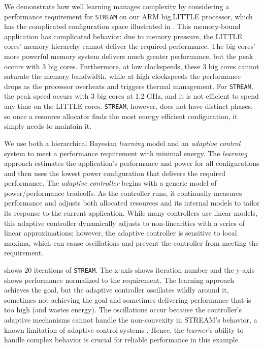 We demonstrate how well learning manages complexity by considering a
performance requirement for \texttt{STREAM} on our ARM big.LITTLE
processor, which has the complicated configuration space illustrated
in .  This memory-bound application has
complicated behavior: due to memory pressure, the LITTLE cores' memory
hierarchy cannot deliver the required performance.  The big cores'
more powerful memory system delivers much greater performance, but the
peak occurs with 3 big cores.  Furthermore, at low clockspeeds, these
3 big cores cannot saturate the memory bandwidth, while at high
clockspeeds the performance drops as the processor overheats and
triggers thermal management.  For \texttt{STREAM}, the peak speed
occurs with 3 big cores at 1.2 GHz, and it is not efficient to spend
any time on the LITTLE cores.  \texttt{STREAM}, however, does not have
distinct phases, so once a resource allocator finds the most energy
efficient configuration, it simply needs to maintain it.  

We use both a hierarchical Bayesian \emph{learning} model \cite{LEO}
and an \emph{adaptive control} system \cite{POET} to meet a
performance requirement with minimal energy.  The \emph{learning}
approach estimates the application's performance and power for all
configurations and then uses the lowest power configuration that
delivers the required performance.  The \emph{adaptive controller}
begins with a generic model of power/performance tradeoffs.  As the
controller runs, it continually measures performance and adjusts both
allocated resources and its internal models to tailor its response to
the current application.  While many controllers use linear models,
this adaptive controller dynamically adjusts to non-linearities with a
series of linear approximations; however, the adaptive controller is
sensitive to local maxima, which can cause oscillations and prevent
the controller from meeting the requirement.

 shows 20 iterations of \texttt{STREAM}.  The
x-axis shows iteration number and the y-axis shows performance
normalized to the requirement.  The learning approach achieves the
goal, but the adaptive controller oscillates wildly around it,
sometimes not achieving the goal and sometimes delivering performance
that is too high (and wastes energy).  The oscillations occur because
the controller's adaptive mechanisms cannot handle the non-convexity
in STREAM's behavior, a known limitation of adaptive control systems
\cite{ControlWare,POET,ICSE2014}.  Hence, the \emph{learner}'s ability
to handle complex behavior is crucial for reliable performance in this
example.

